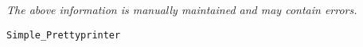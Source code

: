 \label{pkg:simple\_prettyprinter}

{\tiny \it The above information is manually maintained and may contain errors.}
\begin{verbatim}
Simple_Prettyprinter
\end{verbatim}
